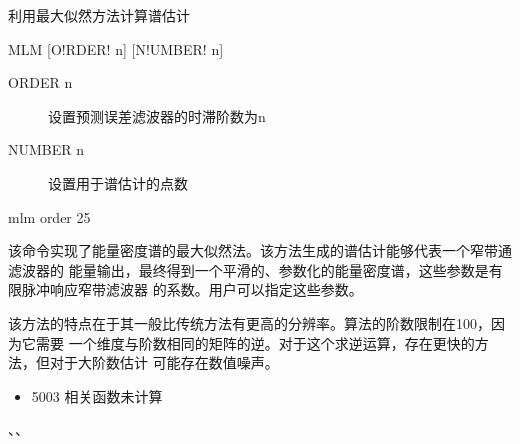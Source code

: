 \label{spe:mlm}

利用最大似然方法计算谱估计

\begin{SACSTX}
MLM [O!RDER! n] [N!UMBER! n]
\end{SACSTX}

\begin{description}
\item [ORDER n] 设置预测误差滤波器的时滞阶数为n
\item [NUMBER n] 设置用于谱估计的点数
\end{description}

\begin{SACDFT}
mlm order 25
\end{SACDFT}

该命令实现了能量密度谱的最大似然法。该方法生成的谱估计能够代表一个窄带通滤波器的
能量输出，最终得到一个平滑的、参数化的能量密度谱，这些参数是有限脉冲响应窄带滤波器
的系数。用户可以指定这些参数。

该方法的特点在于其一般比传统方法有更高的分辨率。算法的阶数限制在100，因为它需要
一个维度与阶数相同的矩阵的逆。对于这个求逆运算，存在更快的方法，但对于大阶数估计
可能存在数值噪声。

\begin{itemize}
\item 5003 相关函数未计算
\end{itemize}

、、

